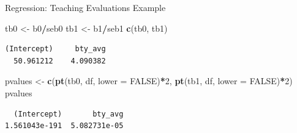 \documentclass[
  ignorenonframetext,
]{beamer}
\newenvironment{Shaded}{\begin{snugshade}}{\end{snugshade}}
\newcommand{\AttributeTok}[1]{\textcolor[rgb]{0.13,0.29,0.53}{#1}}
\newcommand{\ConstantTok}[1]{\textcolor[rgb]{0.56,0.35,0.01}{#1}}
\newcommand{\DecValTok}[1]{\textcolor[rgb]{0.00,0.00,0.81}{#1}}
\newcommand{\FunctionTok}[1]{\textcolor[rgb]{0.13,0.29,0.53}{\textbf{#1}}}
\newcommand{\NormalTok}[1]{#1}
\newcommand{\OtherTok}[1]{\textcolor[rgb]{0.56,0.35,0.01}{#1}}
\newcommand{\SpecialCharTok}[1]{\textcolor[rgb]{0.81,0.36,0.00}{\textbf{#1}}}
\begin{document}
\begin{frame}[fragile]{Regression: Teaching Evaluations Example}
\protect\hypertarget{regression-teaching-evaluations-example-11}{}
\tiny

\begin{Shaded}
\begin{Highlighting}[]
\NormalTok{tb0 }\OtherTok{\textless{}{-}}\NormalTok{ b0}\SpecialCharTok{/}\NormalTok{seb0}
\NormalTok{tb1 }\OtherTok{\textless{}{-}}\NormalTok{ b1}\SpecialCharTok{/}\NormalTok{seb1}
\FunctionTok{c}\NormalTok{(tb0, tb1)}
\end{Highlighting}
\end{Shaded}

\begin{verbatim}
(Intercept)     bty_avg 
  50.961212    4.090382 
\end{verbatim}

\begin{Shaded}
\begin{Highlighting}[]
\NormalTok{pvalues }\OtherTok{\textless{}{-}} \FunctionTok{c}\NormalTok{(}\FunctionTok{pt}\NormalTok{(tb0, df, }\AttributeTok{lower =} \ConstantTok{FALSE}\NormalTok{)}\SpecialCharTok{*}\DecValTok{2}\NormalTok{, }\FunctionTok{pt}\NormalTok{(tb1, df, }\AttributeTok{lower =} \ConstantTok{FALSE}\NormalTok{)}\SpecialCharTok{*}\DecValTok{2}\NormalTok{)}
\NormalTok{pvalues}
\end{Highlighting}
\end{Shaded}

\begin{verbatim}
  (Intercept)       bty_avg 
1.561043e-191  5.082731e-05 
\end{verbatim}

\normalsize
\end{frame}
\end{document}
